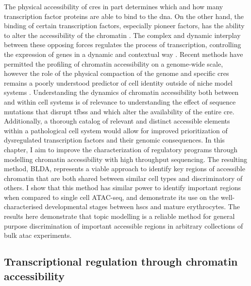 The physical accessibility of \Glspl{cre} in part determines which and how many transcription factor proteins are able to bind to the \gls{dna}. On the other hand, the binding of certain transcription factors, especially pioneer factors, has the ability to alter the accessibility of the chromatin \cite{Zaret2011}. The complex and dynamic interplay between these opposing forces regulates the process of transcription, controlling the expression of genes in a dynamic and contextual way \cite{Minnoye2021, Klemm}. Recent methods have permitted the profiling of chromatin accessibility on a genome-wide scale, however the role of the physical compaction of the genome and specific \glspl{cre} remains a poorly understood predictor of cell identity outside of niche model systems \cite{Schulz2019}. Understanding the dynamics of chromatin accessibility both between and within cell systems is of relevance to understanding the effect of sequence mutations that disrupt \glspl{tfbs} and which alter the availability of the entire \gls{cre}. Additionally, a thorough catalog of relevant and distinct accessible elements within a pathological cell system would allow for improved prioritization of dysregulated transcription factors and their genomic consequences. In this chapter, I aim to improve the characterization of regulatory programs through modelling chromatin accessibility with high throughput sequencing. The resulting method, BLDA, represents a viable approach to identify key regions of accessible chromatin that are both shared between similar cell types and discriminatory of others. I show that this method has similar power to identify important regions when compared to single cell ATAC-seq, and demonstrate its use on the well-characterised developmental stages between \glspl{hsc} and mature erythrocytes. The results here demonstrate that topic modelling is a reliable method for general purpose discrimination of important accessible regions in arbitrary collections of bulk \gls{atac} experiments.

\subsection{Transcriptional regulation through chromatin accessibility} \label{ch3:chrom_acc}

